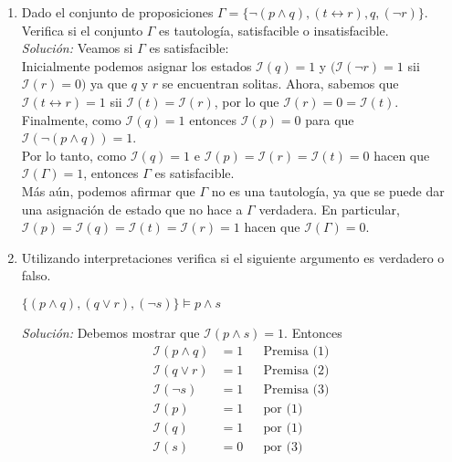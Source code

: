 \documentclass[letterpaper,10pt]{article}
\begin{document}
\begin{enumerate}
\begin{itemize}
\begin{teo}
\begin{itemize}
                \end{itemize}
            \end{teo}

        \end{itemize}

        \item Dado el conjunto de proposiciones 
        $\Gamma = \{ \neg (p \land q), (t \leftrightarrow r), q, (\neg r) \}$.
        Verifica si el conjunto $\Gamma$ es tautología, satisfacible o
        insatisfacible. \\
        \textit{Solución:} Veamos si $\Gamma$ es satisfacible: \\
        Inicialmente podemos asignar los estados $\mathcal{I}(q) = 1$ y
        $(\mathcal{I}(\neg r) = 1$ sii $\mathcal{I}(r) = 0)$ ya que $q$ y $r$
        se encuentran solitas. Ahora, sabemos que 
        $\mathcal{I}(t \leftrightarrow r) = 1$ sii 
        $\mathcal{I}(t) = \mathcal{I}(r)$, por lo que 
        $\mathcal{I}(r) = 0 = \mathcal{I}(t)$. Finalmente, como 
        $\mathcal{I}(q) = 1$ entonces $\mathcal{I}(p) = 0$ para que 
        $\mathcal{I}(\neg (p \land q)) = 1$. \\
        Por lo tanto, como $\mathcal{I}(q) = 1$ e 
        $\mathcal{I}(p) = \mathcal{I}(r) = \mathcal{I}(t) = 0$ hacen que 
        $\mathcal{I}(\Gamma) = 1$, entonces $\Gamma$ es satisfacible. \\

        Más aún, podemos afirmar que $\Gamma$ no es una tautología, ya que se 
        puede dar una asignación de estado que no hace a $\Gamma$ verdadera.
        En particular, 
        $\mathcal{I}(p) = \mathcal{I}(q) = \mathcal{I}(t) =\mathcal{I}(r)= 1$ 
        hacen que $\mathcal{I}(\Gamma) = 0$.

        \item Utilizando interpretaciones verifica si el siguiente argumento
        es verdadero o falso.
        \begin{center}
            $\{ (p \land q), (q \lor r), (\neg s) \} \models p \land s$
        \end{center}
        \textit{Solución:} Debemos mostrar que $\mathcal{I}(p \land s) = 1$.
        Entonces 
        \begin{align*}
            \mathcal{I}(p \land q) &= 1
            && \text{Premisa (1)} \\
            \mathcal{I}(q \lor r) &= 1
            && \text{Premisa (2)} \\
            \mathcal{I}(\neg s) &= 1 
            && \text{Premisa (3)} \\
            \mathcal{I}(p) &= 1
            && \text{por (1)} \\
            \mathcal{I}(q) &= 1
            && \text{por (1)} \\
            \mathcal{I}(s) &= 0
            && \text{por (3)}
        \end{align*}


\end{enumerate}
\end{document}
